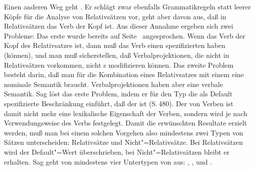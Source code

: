 Einen anderen Weg geht \citet{Sag97a}. Er schlägt zwar ebenfalls Grammatikregeln statt leerer Köpfe
für die Analyse von Relativsätzen vor, geht aber davon aus, daß in Relativsätzen das Verb der Kopf
ist. Aus dieser Annahme ergeben sich zwei Probleme: Das erste wurde bereits auf
Seite~\pageref{Erklaerung-relativizer} angesprochen. Wenn das Verb der Kopf des Relativsatzes ist,
dann muß das Verb einen spezifizierten \modw haben (können), und man muß sicherstellen, daß
Verbalprojektionen, die nicht in Relativsätzen vorkommen, nicht \nbar{}s modifizieren können. Das
zweite Problem besteht darin, daß man für die Kombination eines Relativsatzes mit einem \nbar eine
nominale Semantik braucht. Verbalprojektionen haben aber eine verbale Semantik. Sag löst das erste
Problem, indem er für den Typ  die als Default spezifizierte Beschränkung
einführt, daß der \modw {} ist (S.\,480). Der \modw von Verben ist damit nicht mehr eine
lexikalische Eigenschaft der Verben, sondern wird je nach Verwendungsweise des Verbs
festgelegt. Damit die erwünschten Resultate erzielt werden, muß man bei einem solchen Vorgehen also
mindestens zwei Typen von Sätzen unterscheiden: Relativsätze und Nicht"=Relativsätze. Bei
Relativsätzen wird der Default"=Wert überschrieben, bei Nicht"=Relativsätzen bleibt er erhalten. Sag geht von
mindestens vier Untertypen von  aus: , ,  und
. 
